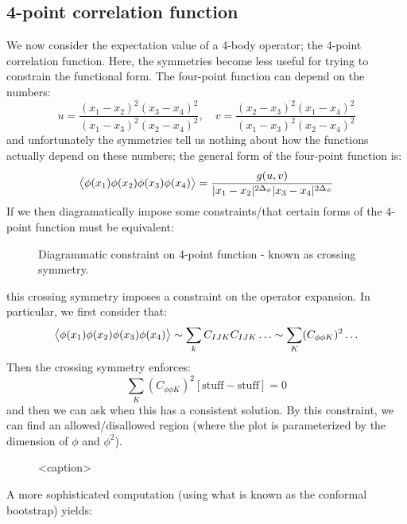 \subsection{4-point correlation function}
We now consider the expectation value of a 4-body operator; the 4-point correlation function. Here, the symmetries become less useful for trying to constrain the functional form. The four-point function can depend on the numbers:
\begin{equation}
    u = \frac{(x_1 - x_2)^2(x_3 - x_4)^2}{(x_1 - x_3)^2(x_2 - x_4)^2}, \quad v = \frac{(x_2 - x_3)^2(x_1 - x_4)^2}{(x_1 - x_3)^2(x_2 - x_4)^2}
\end{equation}
and unfortunately the symmetries tell us nothing about how the functions actually depend on these numbers; the general form of the four-point function is:
\begin{equation}
    \avg{\phi(x_1)\phi(x_2)\phi(x_3)\phi(x_4)} = \frac{g(u, v)}{\abs{x_1 - x_2}^{2\Delta_\phi}\abs{x_3 - x_4}^{2\Delta_\phi}}
\end{equation}
If we then diagramatically impose some constraints/that certain forms of the 4-point function must be equivalent:
\begin{figure}[htbp]
    \centering
    
    \caption{Diagrammatic constraint on 4-point function - known as crossing symmetry.}
    \label{fig-crossingsymmetry}
\end{figure}
this crossing symmetry imposes a constraint on the operator expansion. In particular, we first consider that:
\begin{equation}
    \avg{\phi(x_1)\phi(x_2)\phi(x_3)\phi(x_4)} \sim \sum_k C_{IJK}C_{IJK}\ldots \sim \sum_K(C_{\phi\phi K})^2\ldots
\end{equation}
Then the crossing symmetry enforces:
\begin{equation}
    \sum_K(C_{\phi\phi K})^2[\text{stuff} - \text{stuff}] = 0
\end{equation}
and then we can ask when this has a consistent solution. By this constraint, we can find an allowed/disallowed region (where the plot is parameterized by the dimension of $\phi$ and $\phi^2$).

\begin{figure}[htbp]
    \centering
    
    \caption{<caption>}
    \label{<label>}
\end{figure}

A more sophisticated computation (using what is known as the conformal bootstrap) yields:


